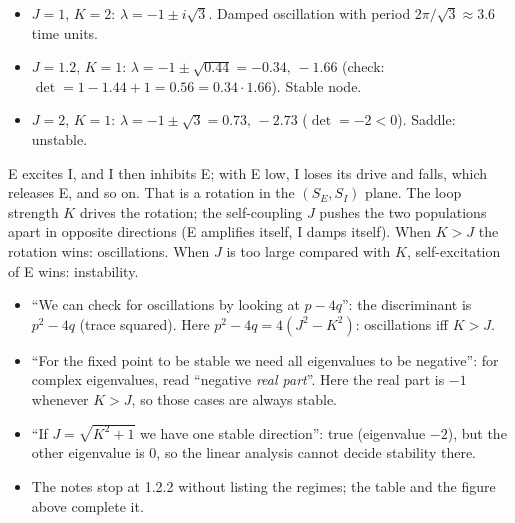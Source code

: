 \begin{example}
\begin{itemize}
  \item $J=1$, $K=2$: $\lambda=-1\pm i\sqrt3$. Damped oscillation with period $2\pi/\sqrt3\approx3.6$ time units.
  \item $J=1.2$, $K=1$: $\lambda=-1\pm\sqrt{0.44}=-0.34,\,-1.66$ (check: $\det=1-1.44+1=0.56=0.34\cdot1.66$). Stable node.
  \item $J=2$, $K=1$: $\lambda=-1\pm\sqrt3=0.73,\,-2.73$ ($\det=-2<0$). Saddle: unstable.
\end{itemize}
\end{example}

\begin{intuition}
E excites I, and I then inhibits E; with E low, I loses its drive and falls, which releases E, and so on. That is a rotation in the $(S_E,S_I)$ plane. The loop strength $K$ drives the rotation; the self-coupling $J$ pushes the two populations apart in opposite directions (E amplifies itself, I damps itself).
When $K>J$ the rotation wins: oscillations. When $J$ is too large compared with $K$, self-excitation of E wins: instability.
\end{intuition}

\begin{pitfall}
\begin{itemize}
  \item ``We can check for oscillations by looking at $p-4q$'': the discriminant is $p^2-4q$ (trace squared). Here $p^2-4q=4(J^2-K^2)$: oscillations iff $K>J$.
  \item ``For the fixed point to be stable we need all eigenvalues to be negative'': for complex eigenvalues, read ``negative \emph{real part}''. Here the real part is $-1$ whenever $K>J$, so those cases are always stable.
  \item ``If $J=\sqrt{K^2+1}$ we have one stable direction'': true (eigenvalue $-2$), but the other eigenvalue is $0$, so the linear analysis cannot decide stability there.
  \item The notes stop at 1.2.2 without listing the regimes; the table and the figure above complete it.
\end{itemize}
\end{pitfall}



